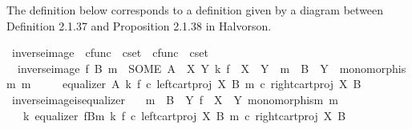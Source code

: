 \begin{isabellebody}
\begin{isamarkuptext}
The definition below corresponds to a definition given by a diagram between Definition 2.1.37 and Proposition 2.1.38 in Halvorson.%
\end{isamarkuptext}\isamarkuptrue%
\isamarkupfalse%
\ inverse{\isacharunderscore}{\kern0pt}image\ {\isacharcolon}{\kern0pt}{\isacharcolon}{\kern0pt}\ {\isachardoublequoteopen}cfunc\ {\isasymRightarrow}\ cset\ {\isasymRightarrow}\ cfunc\ {\isasymRightarrow}\ cset{\isachardoublequoteclose}\ {\isacharparenleft}{\kern0pt}{\isachardoublequoteopen}{\isacharunderscore}{\kern0pt}\isactrlsup {\isacharminus}{\kern0pt}\isactrlbsub {\isacharunderscore}{\kern0pt}\isactrlesub {\isachardoublequoteclose}\ {\isacharbrackleft}{\kern0pt}{}{}{}{\isacharcomma}{\kern0pt}{}{\isacharcomma}{\kern0pt}{}{\isacharbrackright}{\kern0pt}{}{}{}{\isacharparenright}{\kern0pt}\ \isanewline
\ \ {\isachardoublequoteopen}inverse{\isacharunderscore}{\kern0pt}image\ f\ B\ m\ {\isacharequal}{\kern0pt}\ {\isacharparenleft}{\kern0pt}SOME\ A{\isachardot}{\kern0pt}\ {\isasymexists}\ X\ Y\ k{\isachardot}{\kern0pt}\ f\ {\isacharcolon}{\kern0pt}\ X\ {\isasymrightarrow}\ Y\ {\isasymand}\ m\ {\isacharcolon}{\kern0pt}\ B\ {\isasymrightarrow}\ Y\ {\isasymand}\ monomorphism\ m\ {\isasymand}\isanewline
\ \ \ \ equalizer\ A\ k\ {\isacharparenleft}{\kern0pt}f\ {\isasymcirc}\isactrlsub c\ left{\isacharunderscore}{\kern0pt}cart{\isacharunderscore}{\kern0pt}proj\ X\ B{\isacharparenright}{\kern0pt}\ {\isacharparenleft}{\kern0pt}m\ {\isasymcirc}\isactrlsub c\ right{\isacharunderscore}{\kern0pt}cart{\isacharunderscore}{\kern0pt}proj\ X\ B{\isacharparenright}{\kern0pt}{\isacharparenright}{\kern0pt}{\isachardoublequoteclose}\isanewline
\isanewline
{}\isamarkupfalse%
\ inverse{\isacharunderscore}{\kern0pt}image{\isacharunderscore}{\kern0pt}is{\isacharunderscore}{\kern0pt}equalizer{\isacharcolon}{\kern0pt}\isanewline
\ \ \ {\isachardoublequoteopen}m\ {\isacharcolon}{\kern0pt}\ B\ {\isasymrightarrow}\ Y{\isachardoublequoteclose}\ {\isachardoublequoteopen}f\ {\isacharcolon}{\kern0pt}\ X\ {\isasymrightarrow}\ Y{\isachardoublequoteclose}\ {\isachardoublequoteopen}monomorphism\ m{\isachardoublequoteclose}\isanewline
\ \ \ {\isachardoublequoteopen}{\isasymexists}k{\isachardot}{\kern0pt}\ equalizer\ {\isacharparenleft}{\kern0pt}f\isactrlsup {\isacharminus}{\kern0pt}B{\isasymrparr}\isactrlbsub m\isactrlesub {\isacharparenright}{\kern0pt}\ k\ {\isacharparenleft}{\kern0pt}f\ {\isasymcirc}\isactrlsub c\ left{\isacharunderscore}{\kern0pt}cart{\isacharunderscore}{\kern0pt}proj\ X\ B{\isacharparenright}{\kern0pt}\ {\isacharparenleft}{\kern0pt}m\ {\isasymcirc}\isactrlsub c\ right{\isacharunderscore}{\kern0pt}cart{\isacharunderscore}{\kern0pt}proj\ X\ B{\isacharparenright}{\kern0pt}{\isachardoublequoteclose}\isanewline

\end{isabellebody}
